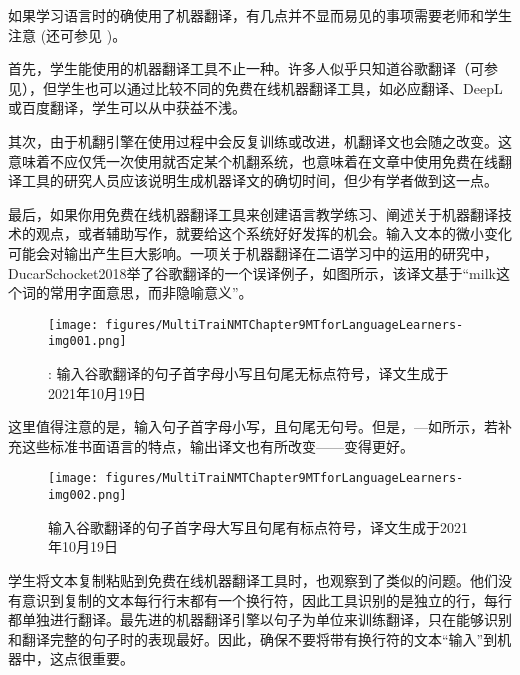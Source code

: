\documentclass[output=paper,colorlinks,citecolor=brown]{langscibook}
\begin{document}

如果学习语言时的确使用了机器翻译，有几点并不显而易见的事项需要老师和学生注意 (还可参见 \citealt{Bowker2020})。

首先，学生能使用的机器翻译工具不止一种。许多人似乎只知道谷歌翻译（可参见\citealt{DorstBouman2022}），但学生也可以通过比较不同的免费在线机器翻译工具，如必应翻译、DeepL或百度翻译，学生可以从中获益不浅。

其次，由于机翻引擎在使用过程中会反复训练或改进，机翻译文也会随之改变。这意味着不应仅凭一次使用就否定某个机翻系统，也意味着在文章中使用免费在线翻译工具的研究人员应该说明生成机器译文的确切时间，但少有学者做到这一点。

最后，如果你用免费在线机器翻译工具来创建语言教学练习、阐述关于机器翻译技术的观点，或者辅助写作，就要给这个系统好好发挥的机会。输入文本的微小变化可能会对输出产生巨大影响。一项关于机器翻译在二语学习中的运用的研究中，{DucarSchocket2018}举了谷歌翻译的一个误译例子，如图所示，该译文基于“milk这个词的常用字面意思，而非隐喻意义”。

\begin{figure}
\texttt{[image: figures/MultiTraiNMTChapter9MTforLanguageLearners-img001.png]}
\caption{\label{fig:carre:1}: 输入谷歌翻译的句子首字母小写且句尾无标点符号，译文生成于2021年10月19日}
\end{figure}

这里值得注意的是，输入句子首字母小写，且句尾无句号。但是，—如所示，若补充这些标准书面语言的特点，输出译文也有所改变——变得更好。

\begin{figure}
\texttt{[image: figures/MultiTraiNMTChapter9MTforLanguageLearners-img002.png]}
 \caption{输入谷歌翻译的句子首字母大写且句尾有标点符号，译文生成于2021年10月19日}
\label{fig:carre:2}
\end{figure}

学生将文本复制粘贴到免费在线机器翻译工具时，也观察到了类似的问题。他们没有意识到复制的文本每行行末都有一个换行符，因此工具识别的是独立的行，每行都单独进行翻译。最先进的机器翻译引擎以句子为单位来训练翻译，只在能够识别和翻译完整的句子时的表现最好。因此，确保不要将带有换行符的文本“输入”到机器中，这点很重要。
\end{document}
